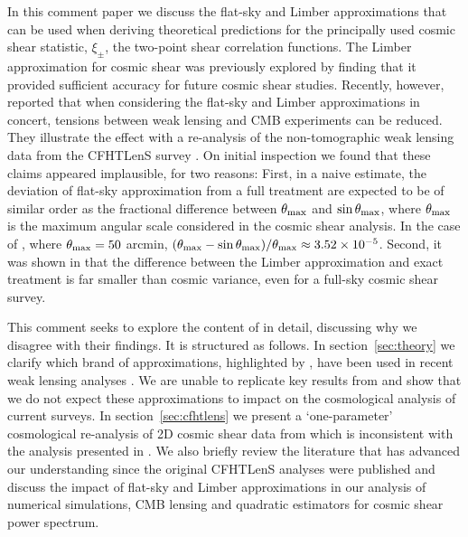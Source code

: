 \documentclass[a4paper, preprint, fleqn, usenatbib]{aastex}
\begin{document}
In this comment paper we discuss the flat-sky and Limber approximations that can be used when deriving theoretical predictions for the principally used cosmic shear statistic, $\xi_\pm$, the two-point shear correlation functions. The Limber approximation for cosmic shear was previously explored by \citet{giannantonio/etal:2012} finding that it provided sufficient accuracy for future cosmic shear studies. Recently, however, \citet{kitching/etal:2016} reported that when considering the flat-sky and Limber approximations in concert, tensions between weak lensing and CMB experiments can be reduced. They illustrate the effect with a re-analysis of the non-tomographic weak lensing data from the CFHTLenS survey \citep{kilbinger/etal:2013}.    On initial inspection we found that these claims appeared implausible, for two reasons: First, in a naive estimate, the deviation of flat-sky approximation from a full treatment are expected to be of similar order as the fractional difference between $\theta_{\rm max}$ and $\sin\theta_{\rm max}$,
where $\theta_{\rm max}$ is the maximum angular scale considered in the cosmic shear analysis. In the case of \citep{hildebrandt/etal:2016}, where $\theta_{\rm max}=50$ arcmin, $(\theta_{\rm max} - \sin\theta_{\rm max})/\theta_{\rm max} \approx 3.52 \times 10^{-5}$.  Second, it was shown in \citet[][see their Fig.3]{giannantonio/etal:2012} that the difference between the Limber approximation and exact treatment is far smaller than cosmic variance, even for a full-sky cosmic shear survey.

This comment seeks to explore the content of \citet{kitching/etal:2016} in detail, discussing why we disagree with their findings.  It is structured as follows.  In section~\ref{sec:theory} we clarify which brand of approximations, highlighted by \citet{kitching/etal:2016}, have been used in recent weak lensing analyses \citep{joudaki/etal:2016, hildebrandt/etal:2016, joudaki/etal:2017}.  We are unable to replicate key results from \citet{kitching/etal:2016} and show that we do not expect these approximations to impact on the cosmological analysis of current surveys.  In section~\ref{sec:cfhtlens} we present a `one-parameter' cosmological re-analysis of 2D cosmic shear data from \citet{kilbinger/etal:2013} which is inconsistent with the analysis presented in \citet{kitching/etal:2016}.  We also briefly review the literature that has advanced our understanding since the original CFHTLenS analyses were published and discuss the impact of flat-sky and Limber approximations in our analysis of numerical simulations, CMB lensing and quadratic estimators for cosmic shear power spectrum.
\end{document}
